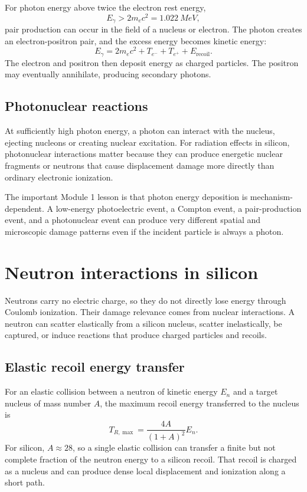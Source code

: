 \documentclass[11pt]{article}
\begin{document}
For photon energy above twice the electron rest energy,
\begin{equation}
E_\gamma > 2m_e c^2 = \SI{1.022}{MeV},
\end{equation}
pair production can occur in the field of a nucleus or electron. The photon creates an electron-positron pair, and the excess energy becomes kinetic energy:
\begin{equation}
E_\gamma = 2m_e c^2 + T_{e^-}+T_{e^+}+E_{\mathrm{recoil}}.
\end{equation}
The electron and positron then deposit energy as charged particles. The positron may eventually annihilate, producing secondary photons.

\subsection{Photonuclear reactions}

At sufficiently high photon energy, a photon can interact with the nucleus, ejecting nucleons or creating nuclear excitation. For radiation effects in silicon, photonuclear interactions matter because they can produce energetic nuclear fragments or neutrons that cause displacement damage more directly than ordinary electronic ionization.

The important Module 1 lesson is that photon energy deposition is mechanism-dependent. A low-energy photoelectric event, a Compton event, a pair-production event, and a photonuclear event can produce very different spatial and microscopic damage patterns even if the incident particle is always a photon.

\section{Neutron interactions in silicon}

Neutrons carry no electric charge, so they do not directly lose energy through Coulomb ionization. Their damage relevance comes from nuclear interactions. A neutron can scatter elastically from a silicon nucleus, scatter inelastically, be captured, or induce reactions that produce charged particles and recoils.

\subsection{Elastic recoil energy transfer}

For an elastic collision between a neutron of kinetic energy $E_n$ and a target nucleus of mass number $A$, the maximum recoil energy transferred to the nucleus is
\begin{equation}
T_{R,\max}
=
\frac{4A}{(1+A)^2}E_n.
\label{eq:neutron_recoil_max}
\end{equation}
For silicon, $A\approx 28$, so a single elastic collision can transfer a finite but not complete fraction of the neutron energy to a silicon recoil. That recoil is charged as a nucleus and can produce dense local displacement and ionization along a short path.
\end{document}
